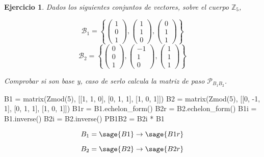 \documentclass{amsart}
\newtheorem{ejer}{Ejercicio}
\def\z{\mathbb{Z}}
\begin{document}
\begin{ejer} Dados los siguientes conjuntos de vectores, sobre el cuerpo $\z _5$,  

\[\mathcal{B}_1 = \left\lbrace \left( \begin{array}{c}
1 \\ 0 \\ 1            
\end{array} \right), 
\left( \begin{array}{c}
           
1 \\ 1 \\ 0           
\end{array} \right), 
\left( \begin{array}{c} 
           
0 \\ 1 \\ 1           
\end{array} \right) \right\rbrace \]
\[\mathcal{B}_2 = \left\lbrace \left( \begin{array}{c}
0 \\ 0 \\ 1            
\end{array} \right), 
\left( \begin{array}{r}
           
-1 \\ 1 \\ 0           
\end{array} \right), 
\left( \begin{array}{c}
           
1 \\ 1 \\ 1           
\end{array} \right) \right\rbrace  \]

Comprobar si son base y, caso de serlo calcula la matriz de paso $\mathcal{P}_{B_1B_2}$.
\end{ejer}

\begin{sageblock}
	B1 = matrix(Zmod(5), [[1, 1, 0], [0, 1, 1], [1, 0, 1]])
	B2 = matrix(Zmod(5), [[0, -1, 1], [0, 1, 1], [1, 0, 1]])
	B1r = B1.echelon_form()
	B2r = B2.echelon_form()
	B1i = B1.inverse()
	B2i = B2.inverse()
	PB1B2 = B2i * B1
\end{sageblock}

$$
	B_1 = \sage{B1} \to \sage{B1r}
$$

$$
	B_2 = \sage{B2} \to \sage{B2r}
$$
\end{document}
